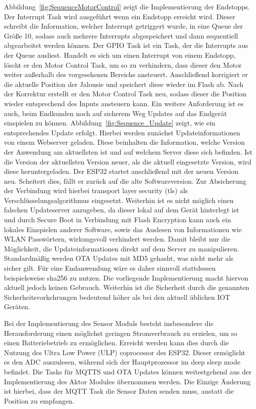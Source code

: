 Abbildung~\ref{fig:SequenceMotorControl} zeigt die Implementierung der Endstopps. Der Interrupt Task wird ausgeführt wenn ein Endstopp erreicht wird. Dieser schreibt die Information, welcher Interrupt getriggert wurde, in eine Queue der Größe 10, sodass auch mehrere Interrupts abgespeichert und dann sequentiell abgearbeitet werden können. Der GPIO Task ist ein Task, der die Interrupts aus der Queue ausliest. Handelt es sich um einen Interrupt von einem Endstopp, löscht er den Motor Control Task, um so zu verhindern, dass dieser den Motor weiter außerhalb des vorgesehenen Bereichs ansteuert. Anschließend korrigiert er die aktuelle Position der Jalousie und speichert diese wieder im Flash ab. Nach der Korrektur erstellt er den Motor Control Task neu, sodass dieser die Position wieder entsprechend des Inputs ansteuern kann. Ein weitere Anforderung ist es auch, beim Endkunden noch auf sicherem Weg Updates auf das Endgerät einspielen zu können. Abbildung~\ref{fig:Sequence_Update} zeigt, wie ein entsprechendes Update erfolgt. Hierbei werden zunächst Updateinformationen von einem Webserver geladen. Diese beinhalten die Information, welche Version der Anwendung am aktuellsten ist und auf welchem Server diese sich befinden. Ist die Version der aktuellsten Version neuer, als die aktuell eingesetzte Version, wird diese heruntergeladen. Der ESP32 startet anschließend mit der neuen Version neu. Scheitert dies, fällt er zurück auf die alte Softwareversion. Zur Absicherung der Verbindung wird hierbei transport layer security (tls) als Verschlüsselungsalgorithmus eingesetzt. Weiterhin ist es nicht möglich einen falschen Updateserver anzugeben, da dieser lokal auf dem Gerät hinterlegt ist und durch Secure Boot in Verbindung mit Flash Encryption kann auch ein lokales Einspielen anderer Software, sowie das Auslesen von Informationen wie WLAN Passwörtern, wirkungsvoll verhindert werden. Damit bleibt nur die Möglichkeit, die Updateinformationen direkt auf dem Server zu manipulieren. Standardmäßig werden OTA Updates mit MD5 gehasht, was nicht mehr als sicher gilt. Für eine Endanwendung wäre es daher sinnvoll stattdessen beispielsweise sha256 zu nutzen. Die vorliegende Implementierung macht hiervon aktuell jedoch keinen Gebrauch. Weiterhin ist die Sicherheit durch die genannten Sicherheitsvorkehrungen bedeutend höher als bei den aktuell üblichen IOT Geräten.

Bei der Implementierung des Sensor Moduls besteht insbesondere die Herausforderung einen möglichst geringen Stromverbrauch zu erzielen, um so einen Batteriebetrieb zu ermöglichen. Erreicht werden kann dies durch die Nutzung des Ultra Low Power (ULP) coprocessor des ESP32. Dieser ermöglicht es den ADC auszulesen, während sich der Hauptprozessor im deep sleep mode befindet. Die Tasks für MQTTS und OTA Updates können weitestgehend aus der Implementierung des Aktor Modules übernommen werden. Die Einzige Änderung ist hierbei, dass der MQTT Task die Sensor Daten senden muss, anstatt die Position zu empfangen.

